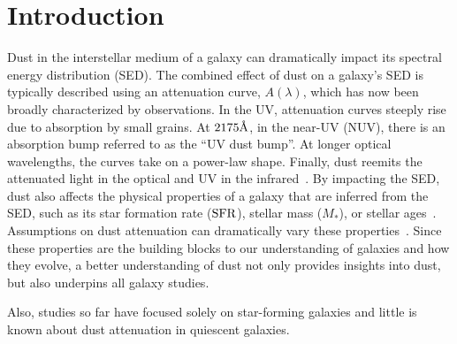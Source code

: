 \section{Introduction} \label{sec:intro} 
Dust in the interstellar medium of a galaxy can dramatically impact its
spectral energy distribution (SED). %
The combined effect of dust on a galaxy's SED is typically described using
an attenuation curve, $A(\lambda)$, which has now been broadly characterized 
by observations. 
In the UV, attenuation curves steeply rise due to absorption by small grains.
At $2175\AA$, in the near-UV (NUV), there is an absorption bump referred to as
the ``UV dust bump''. 
At longer optical wavelengths, the curves take on a power-law shape. 
Finally, dust reemits the attenuated light in the optical and UV in the
infrared~\citep[for an overview see][]{calzetti2001, draine2003,
galliano2018}.
By impacting the SED, dust also affects the physical properties of a galaxy
that are inferred from the SED, such as its star formation rate (${\rm SFR}$),
stellar mass ($M_*$), or stellar ages~\citep[see reviews by][]{walcher2011,
conroy2013}. 
Assumptions on dust attenuation can dramatically vary these
properties~\citep{kriek2013, reddy2015, salim2016, salim2020}.
Since these properties are the building blocks to our understanding of
galaxies and how they evolve, a better understanding of dust not only provides
insights into dust, but also underpins all galaxy studies.  

Also, studies so far have focused solely on star-forming galaxies and little is known
about dust attenuation in quiescent galaxies. 

